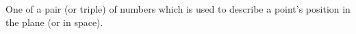 One of a pair (or triple) of numbers which is used
to describe a point's position in the plane (or in
space).